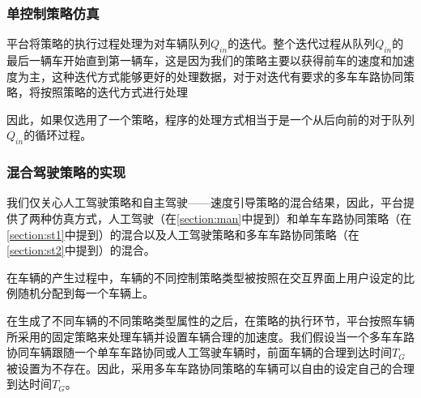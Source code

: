 \documentclass[a4paper,UTF8]{paper}
\begin{document}
\subsubsection{单控制策略仿真}

平台将策略的执行过程处理为对车辆队列$Q_{in}$的迭代。整个迭代过程从队列$Q_{in}$的最后一辆车开始直到第一辆车，这是因为我们的策略主要以获得前车的速度和加速度为主，这种迭代方式能够更好的处理数据，对于对迭代有要求的多车车路协同策略，将按照策略的迭代方式进行处理

因此，如果仅选用了一个策略，程序的处理方式相当于是一个从后向前的对于队列$Q_{in}$的循环过程。

\subsubsection{混合驾驶策略的实现}
我们仅关心人工驾驶策略和自主驾驶——速度引导策略的混合结果，因此，平台提供了两种仿真方式，人工驾驶（在\ref{section:man}中提到）和单车车路协同策略（在\ref{section:st1}中提到）的混合以及人工驾驶策略和多车车路协同策略（在\ref{section:st2}中提到）的混合。

在车辆的产生过程中，车辆的不同控制策略类型被按照在交互界面上用户设定的比例随机分配到每一个车辆上。

在生成了不同车辆的不同策略类型属性的之后，在策略的执行环节，平台按照车辆所采用的固定策略来处理车辆并设置车辆合理的加速度。我们假设当一个多车车路协同车辆跟随一个单车车路协同或人工驾驶车辆时，前面车辆的合理到达时间$T_G$被设置为不存在。因此，采用多车车路协同策略的车辆可以自由的设定自己的合理到达时间$T_G$。
\end{document}
